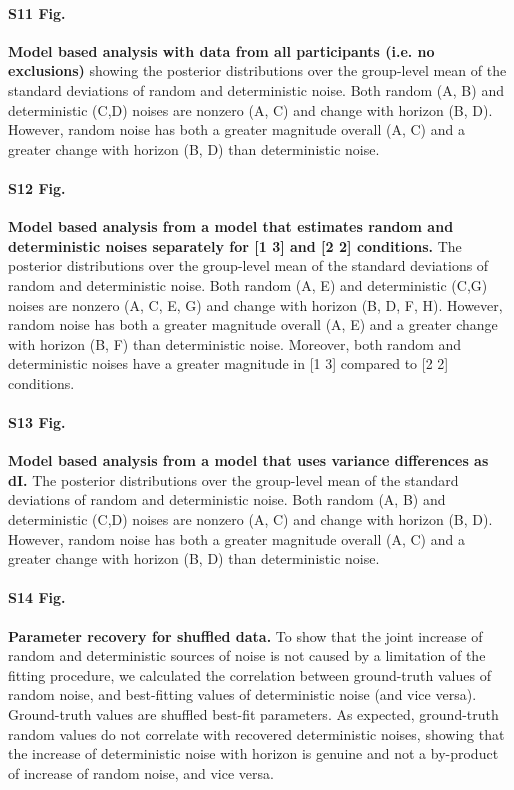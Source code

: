 \documentclass[12pt]{article}
\begin{document}
{\paragraph*{S11 Fig.}
\label{S11_Fig}
{\bf Model based analysis with data from all participants (i.e. no exclusions)} showing the posterior distributions over the group-level mean of the standard deviations of  random and deterministic noise. Both random (A, B) and deterministic (C,D) noises are nonzero (A, C) and change with horizon (B, D).  However, random noise has both a greater magnitude overall (A, C) and a greater change with horizon (B, D) than deterministic noise.

\paragraph*{S12 Fig.}
\label{S12_Fig}
{\bf Model based analysis from a model that estimates random and deterministic noises separately for [1 3] and [2 2] conditions.} The posterior distributions over the group-level mean of the standard deviations of  random and deterministic noise. Both random (A, E) and deterministic (C,G) noises are nonzero (A, C, E, G) and change with horizon (B, D, F, H).  However, random noise has both a greater magnitude overall (A, E) and a greater change with horizon (B, F) than deterministic noise. Moreover, both random and deterministic noises have a greater magnitude in [1 3] compared to [2 2] conditions.

\paragraph*{S13 Fig.}
\label{S13_Fig}
{\bf Model based analysis from a model that uses variance differences as dI.} The posterior distributions over the group-level mean of the standard deviations of  random and deterministic noise. Both random (A, B) and deterministic (C,D) noises are nonzero (A, C) and change with horizon (B, D).  However, random noise has both a greater magnitude overall (A, C) and a greater change with horizon (B, D) than deterministic noise.

\paragraph*{S14 Fig.}
\label{S14_Fig}
{\bf Parameter recovery for shuffled data.} To show that the joint increase of random and deterministic sources of noise is not caused by a limitation of the fitting procedure, we calculated the correlation between ground-truth values of random noise, and best-fitting values of deterministic noise (and vice versa). Ground-truth values are shuffled best-fit parameters. As expected, ground-truth random values do not correlate with recovered deterministic noises, showing that the increase of deterministic noise with horizon is genuine and not a by-product of increase of random noise, and vice versa. 

}
\end{document}
